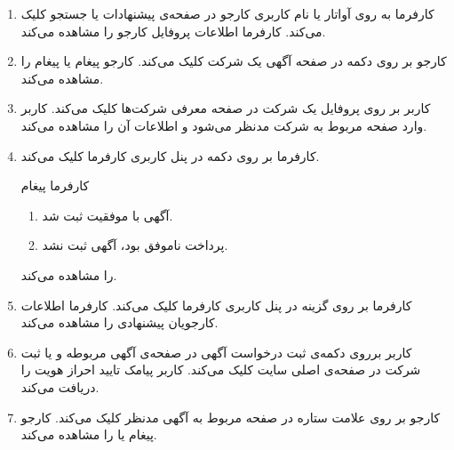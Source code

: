 \begin{enumerate}
	\item[] 
	\tuc				
	{کارفرما به روی آواتار یا نام کاربری کارجو در صفحه‌ی پیشنهادات یا جستجو کلیک می‌کند.}				
	{کارفرما اطلاعات پروفایل کارجو را مشاهده می‌کند.}
	
	\item[] \label{uc:resume}
	\tuc				
	{کارجو بر روی دکمه  در صفحه آگهی یک شرکت کلیک می‌کند.}
	{کارجو پیغام  یا پیغام  را مشاهده می‌کند.}
	
	\item[] \label{uc:company-profile}
	\tuc				
	{کاربر بر روی پروفایل یک شرکت در صفحه معرفی شرکت‌ها کلیک می‌کند.}				
	{کاربر وارد صفحه مربوط به شرکت مدنظر می‌شود و اطلاعات آن را مشاهده می‌کند.}
	\renewcommand{\labelenumi}{\alph{enumi})}
	
	\item[] 
	\tuc
	{کارفرما بر روی دکمه  در پنل کاربری کارفرما کلیک می‌کند.}
	{کارفرما پیغام 
		\begin{enumerate}
			\item 
			آگهی با موفقیت ثبت شد.
			\item 
			پرداخت ناموفق بود، آگهی ثبت نشد.
		\end{enumerate} را مشاهده می‌کند.}
	\renewcommand{\labelenumi}{\arabic{enumi})}
	
	\item[] 
	\tuc
	{کارفرما بر روی گزینه  در پنل کاربری کارفرما کلیک می‌کند.}
	{کارفرما اطلاعات کارجویان پیشنهادی را مشاهده می‌کند.}
	
	\item[] 
	\tuc				
	{کاربر برروی دکمه‌ی ثبت درخواست آگهی در صفحه‌ی آگهی مربوطه و یا ثبت شرکت در صفحه‌ی اصلی سایت کلیک می‌کند.}			
	{کاربر پیامک تایید احراز هویت را دریافت می‌کند.}
	
	\item[] \label{uc:bookmark}
	\tuc
	{کارجو بر روی علامت ستاره در صفحه مربوط به آگهی مدنظر کلیک می‌کند.}
	{کارجو پیغام  یا  را مشاهده می‌کند.}
	

\end{enumerate}
